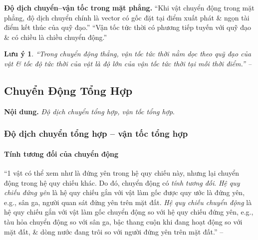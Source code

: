 \documentclass{article}
\numberwithin{equation}{section}
\newtheorem{luuy}{Lưu ý}[section]
\begin{document}
\textbf{Độ dịch chuyển--vận tốc trong mặt phẳng.} ``Khi vật chuyển động trong mặt phẳng, độ dịch chuyển chính là vector có gốc đặt tại điểm xuất phát \& ngọn tài điểm kết thúc của quỹ đạo.'' ``Vận tốc tức thời có phương tiếp tuyến với quỹ đạo \& có chiều là chiều chuyển động.''

\begin{luuy}
	``Trong chuyển động thẳng, vận tốc tức thời nằm dọc theo quỹ đạo của vật \& tốc độ tức thời của vật là độ lớn của vận tốc tức thời tại mỗi thời điểm.'' -- \cite[p. 30]{SGK_Vat_Ly_10_Chan_Troi_Sang_Tao}
\end{luuy}


\subsection{Chuyển Động Tổng Hợp}
\textbf{Nội dung.} \textit{Độ dịch chuyển tổng hợp, vận tốc tổng hợp}.

\subsubsection{Độ dịch chuyển tổng hợp -- vận tốc tổng hợp}

\paragraph{Tính tương đối của chuyển động}
``1 vật có thể xem như là đứng yên trong hệ quy chiếu này, nhưng lại chuyển động trong hệ quy chiếu khác. Do đó, chuyển động có \textit{tính tương đối}. \textit{Hệ quy chiếu đứng yên} là hệ quy chiếu gắn với vật làm gốc được quy ước là đứng yên, e.g., sân ga, người quan sát đứng yên trên mặt đất. \textit{Hệ quy chiếu chuyển động} là hệ quy chiếu gắn với vật làm gốc chuyển động so với hệ quy chiếu đứng yên, e.g., tàu hỏa chuyển động so với sân ga, bậc thang cuộn khi đang hoạt động so với mặt đất, \& dòng nước đang trôi so với người đứng yên trên mặt đất.'' -- \cite[p. 32]{SGK_Vat_Ly_10_Chan_Troi_Sang_Tao}
\end{document}
